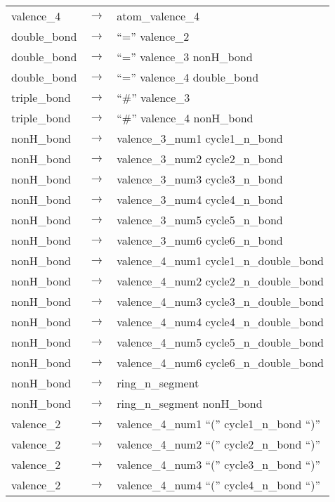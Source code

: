 \documentclass[../Document.tex]{subfiles}
\begin{document}
\begin{longtable}{m{} p{} p{}}
    valence\_4 & $\rightarrow$ & atom\_valence\_4 \\
    double\_bond & $\rightarrow$ & ``='' valence\_2 \\
    double\_bond & $\rightarrow$ & ``='' valence\_3 nonH\_bond \\
    double\_bond & $\rightarrow$ & ``='' valence\_4 double\_bond \\
    triple\_bond & $\rightarrow$ & ``\#'' valence\_3 \\
    triple\_bond & $\rightarrow$ & ``\#'' valence\_4 nonH\_bond \\
    nonH\_bond & $\rightarrow$ & valence\_3\_num1 cycle1\_n\_bond \\
    nonH\_bond & $\rightarrow$ & valence\_3\_num2 cycle2\_n\_bond \\
    nonH\_bond & $\rightarrow$ & valence\_3\_num3 cycle3\_n\_bond \\
    nonH\_bond & $\rightarrow$ & valence\_3\_num4 cycle4\_n\_bond \\
    nonH\_bond & $\rightarrow$ & valence\_3\_num5 cycle5\_n\_bond \\
    nonH\_bond & $\rightarrow$ & valence\_3\_num6 cycle6\_n\_bond \\
    nonH\_bond & $\rightarrow$ & valence\_4\_num1 cycle1\_n\_double\_bond \\
    nonH\_bond & $\rightarrow$ & valence\_4\_num2 cycle2\_n\_double\_bond \\
    nonH\_bond & $\rightarrow$ & valence\_4\_num3 cycle3\_n\_double\_bond \\
    nonH\_bond & $\rightarrow$ & valence\_4\_num4 cycle4\_n\_double\_bond \\
    nonH\_bond & $\rightarrow$ & valence\_4\_num5 cycle5\_n\_double\_bond \\
    nonH\_bond & $\rightarrow$ & valence\_4\_num6 cycle6\_n\_double\_bond \\
    nonH\_bond & $\rightarrow$ & ring\_n\_segment \\
    nonH\_bond & $\rightarrow$ & ring\_n\_segment nonH\_bond \\
    valence\_2 & $\rightarrow$ & valence\_4\_num1 ``('' cycle1\_n\_bond ``)'' \\
    valence\_2 & $\rightarrow$ & valence\_4\_num2 ``('' cycle2\_n\_bond ``)'' \\
    valence\_2 & $\rightarrow$ & valence\_4\_num3 ``('' cycle3\_n\_bond ``)'' \\
    valence\_2 & $\rightarrow$ & valence\_4\_num4 ``('' cycle4\_n\_bond ``)'' \\

\end{longtable}
\end{document}
